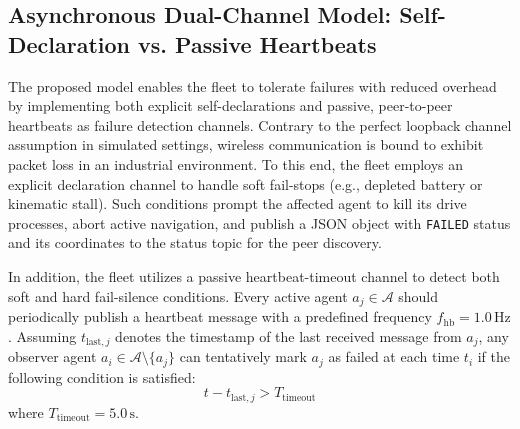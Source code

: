 \subsection{Asynchronous Dual-Channel Model: Self-Declaration vs. Passive Heartbeats}

The proposed model enables the fleet to tolerate failures with reduced overhead by implementing both explicit self-declarations and passive, peer-to-peer heartbeats as failure detection channels. Contrary to the perfect loopback channel assumption in simulated settings, wireless communication is bound to exhibit packet loss in an industrial environment. To this end, the fleet employs an explicit declaration channel to handle soft fail-stops (e.g., depleted battery or kinematic stall). Such conditions prompt the affected agent to kill its drive processes, abort active navigation, and publish a JSON object with \texttt{FAILED} status and its coordinates to the status topic for the peer discovery.

In addition, the fleet utilizes a passive heartbeat-timeout channel to detect both soft and hard fail-silence conditions. Every active agent $a_j \in \mathcal{A}$ should periodically publish a heartbeat message with a predefined frequency $f_{\text{hb}} = 1.0\,\text{Hz}$. Assuming $t_{\text{last}, j}$ denotes the timestamp of the last received message from $a_j$, any observer agent $a_i \in \mathcal{A} \setminus \{a_j\}$ can tentatively mark $a_j$ as failed at each time $t_i$ if the following condition is satisfied:
\begin{equation} t - t_{\text{last}, j} > T_{\text{timeout}} \label{eq:heartbeat_timeout_formula} \end{equation}
where $T_{\text{timeout}} = 5.0\,\text{s}$.

